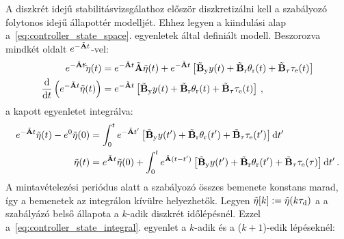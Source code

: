 A diszkrét idejű stabilitásvizsgálathoz először diszkretizálni kell a szabályozó folytonos idejű állapottér modelljét.
Ehhez legyen a kiindulási alap a~\eqref{eq:controller_state_space}. egyenletek által definiált modell.
Beszorozva mindkét oldalt \(e^{-\tilde {\mathbf{A}} t}\)-vel:
\begin{align}
    \begin{split}
        e^{-\tilde {\mathbf{A}} t}\dot\tilde{\mathbf{\eta}}(t) &= e^{-\tilde {\mathbf{A}} t}\tilde {\mathbf{A}} \tilde{\mathbf{\eta}}(t) +
        e^{-\tilde {\mathbf{A}} t}\left[\tilde{\mathbf{B}}_{\mathrm{y}} y(t) + 
        \tilde{\mathbf{B}}_{\mathrm{r}} \theta_{\mathrm{r}}(t) +
        \tilde{\mathbf{B}}_{\mathrm{\tau}} \tau_{\mathrm{e}}(t)\right] \\
        \frac{\mathrm{d}}{\mathrm{d} t}\left(e^{-\tilde {\mathbf{A}} t}\tilde{\mathbf{\eta}}(t)\right) &= e^{-\tilde {\mathbf{A}} t}\left[\tilde{\mathbf{B}}_{\mathrm{y}} y(t) + 
        \tilde{\mathbf{B}}_{\mathrm{r}} \theta_{\mathrm{r}}(t) +
        \tilde{\mathbf{B}}_{\mathrm{\tau}} \tau_{\mathrm{e}}(t)\right]\,, 
    \end{split}        
\end{align}
a kapott egyenletet integrálva:
\begin{align}\label{eq:controller_state_integral}
    \begin{split}
        e^{-\tilde {\mathbf{A}} t}\tilde{\mathbf{\eta}}(t) - e^0 \tilde{\mathbf{\eta}}(0) &= \int_{0}^{t} e^{-\tilde {\mathbf{A}} t'}\left[\tilde{\mathbf{B}}_{\mathrm{y}} y(t') + 
        \tilde{\mathbf{B}}_{\mathrm{r}} \theta_{\mathrm{r}}(t') +
        \tilde{\mathbf{B}}_{\mathrm{\tau}} \tau_{\mathrm{e}}(t')\right] \mathrm{d}t' \\
        \tilde{\mathbf{\eta}}(t) &= e^{\tilde {\mathbf{A}} t}\tilde{\mathbf{\eta}}(0) + \int_{0}^{t} e^{\tilde {\mathbf{A}} (t-t')}\left[\tilde{\mathbf{B}}_{\mathrm{y}} y(t') + 
        \tilde{\mathbf{B}}_{\mathrm{r}} \theta_{\mathrm{r}}(t') +
        \tilde{\mathbf{B}}_{\mathrm{\tau}} \tau_{\mathrm{e}}(\tau)\right] \mathrm{d}t'\,.
    \end{split}        
\end{align}
A mintavételezési periódus alatt a szabályozó összes bemenete konstans marad, így a bemenetek az 
integrálon kívülre helyezhetők. Legyen \(\tilde{\mathbf{\eta}}[k] := \tilde{\mathbf{\eta}}(k\tau_{\mathrm{d}})\) a 
a szabályázó belső állapota a \(k\)-adik diszkrét időlépésnél. Ezzel a~\eqref{eq:controller_state_integral}. 
egyenlet a \(k\)-adik és a (\(k+1\))-edik lépéseknél:
